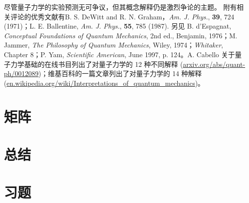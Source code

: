     尽管量子力学的实验预测无可争议，但其概念解释仍是激烈争论的主题。 附有相关评论的优秀文献有B. S. DeWitt and R. N. Graham，\textit{Am. J. Phys.}, \textbf{39}, 724 (1971)；L. E. Ballentine, \textit{Am. J. Phys.}, \textbf{55}, 785 (1987). 另见 B. d'Espagnat, \textit{Conceptual Foundations of Quantum Mechanics}, 2nd ed., Benjamin, 1976；M. Jammer, \textit{The Philosophy of Quantum Mechanics}, Wiley, 1974；\textit{Whitaker}, Chapter 8；P. Yam, \textit{Scientific American}, June 1997, p. 124。A. Cabello 关于量子力学基础的在线书目列出了对量子力学的 12 种不同解释 (\url{arxiv.org/abs/quant-ph/0012089})；维基百科的一篇文章列出了对量子力学的 14 种解释 (\url{en.wikipedia.org/wiki/Interpretations_of_quantum_mechanics})。

\section{矩阵}
\label{sec:7.10 Matrices}
















\section*{总结}

\section*{习题}